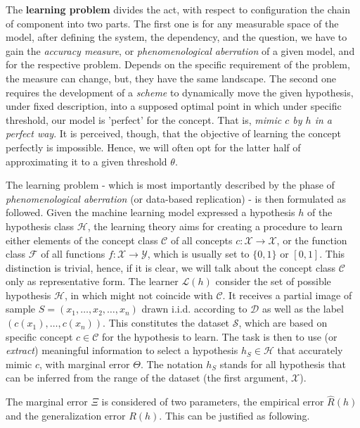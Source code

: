 The \textbf{learning problem} divides the act, with respect to configuration the chain of component into two parts. The first one is for any measurable space of the model, after defining the system, the dependency, and the question, we have to gain the \textit{accuracy measure}, or \textit{phenomenological aberration} of a given model, and for the respective problem. Depends on the specific requirement of the problem, the measure can change, but, they have the same landscape. The second one requires the development of a \textit{scheme} to dynamically move the given hypothesis, under fixed description, into a supposed optimal point in which under specific threshold, our model is 'perfect' for the concept. That is, \textit{mimic $c$ by $h$ in a perfect way}. It is perceived, though, that the objective of learning the concept perfectly is impossible. Hence, we will often opt for the latter half of approximating it to a given threshold $\theta$. 

The learning problem - which is most importantly described by the phase of \textit{phenomenological aberration} (or data-based replication) - is then formulated as followed. Given the machine learning model expressed a hypothesis $h$ of the hypothesis class $\mathcal{H}$, the learning theory aims for creating a procedure to learn either elements of the concept class $\mathcal{C}$ of all concepts $c: \mathcal{X}\to \mathcal{X}$, or the function class $\mathcal{F}$ of all functions $f: \mathcal{X}\to \mathcal{Y}$, which is usually set to $\{0,1\}$ or $[0,1]$. This distinction is trivial, hence, if it is clear, we will talk about the concept class $\mathcal{C}$ only as representative form. The learner $\mathcal{L}(h)$ consider the set of possible hypothesis $\mathcal{H}$, in which might not coincide with $\mathcal{C}$. It receives a partial image of sample $S=(x_{1},\dots,x_{2},\dots,x_n)$ drawn i.i.d. according to $\mathcal{D}$ as well as the label $(c(x_1),\dots,c(x_n))$. This constitutes the dataset $\mathcal{S}$, which are based on specific concept $c\in \mathcal{C}$ for the hypothesis to learn. The task is then to use (or \textit{extract}) meaningful information to select a hypothesis $h_{S}\in \mathcal{H}$ that accurately mimic $c$, with marginal error $\Theta$. The notation $h_{S}$ stands for all hypothesis that can be inferred from the range of the dataset (the first argument, $\mathcal{X}$). 

The marginal error $\Xi$ is considered of two parameters, the empirical error $\hat{R}(h)$ and the generalization error $R(h)$. This can be justified as following. 

